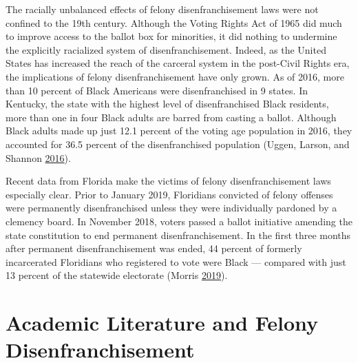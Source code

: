\documentclass[
  12pt,
]{article}
\begin{document}
The racially unbalanced effects of felony disenfranchisement laws were not confined to the 19th century. Although the Voting Rights Act of 1965 did much to improve access to the ballot box for minorities, it did nothing to undermine the explicitly racialized system of disenfranchisement. Indeed, as the United States has increased the reach of the carceral system in the post-Civil Rights era, the implications of felony disenfranchisement have only grown. As of 2016, more than 10 percent of Black Americans were disenfranchised in 9 states. In Kentucky, the state with the highest level of disenfranchised Black residents, more than one in four Black adults are barred from casting a ballot. Although Black adults made up just 12.1 percent of the voting age population in 2016, they accounted for 36.5 percent of the disenfranchised population (Uggen, Larson, and Shannon \protect\hyperlink{ref-sentencing_2016}{2016}).

Recent data from Florida make the victims of felony disenfranchisement laws especially clear. Prior to January 2019, Floridians convicted of felony offenses were permanently disenfranchised unless they were individually pardoned by a clemency board. In November 2018, voters passed a ballot initiative amending the state constitution to end permanent disenfranchisement. In the first three months after permanent disenfranchisement was ended, 44 percent of formerly incarcerated Floridians who registered to vote were Black --- compared with just 13 percent of the statewide electorate (Morris \protect\hyperlink{ref-Morris2019}{2019}).

\hypertarget{academic-literature-and-felony-disenfranchisement}{%
\section{Academic Literature and Felony Disenfranchisement}\label{academic-literature-and-felony-disenfranchisement}}
\end{document}
